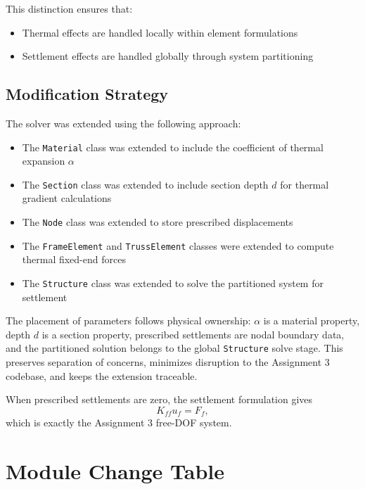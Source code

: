 This distinction ensures that:

\begin{itemize}
    \item Thermal effects are handled locally within element formulations
    \item Settlement effects are handled globally through system partitioning
\end{itemize}

\subsection{Modification Strategy}

The solver was extended using the following approach:

\begin{itemize}
    \item The \texttt{Material} class was extended to include the coefficient of thermal expansion $\alpha$
    \item The \texttt{Section} class was extended to include section depth $d$ for thermal gradient calculations
    \item The \texttt{Node} class was extended to store prescribed displacements
    \item The \texttt{FrameElement} and \texttt{TrussElement} classes were extended to compute thermal fixed-end forces
    \item The \texttt{Structure} class was extended to solve the partitioned system for settlement
\end{itemize}

The placement of parameters follows physical ownership: $\alpha$ is a material property, depth $d$ is a section property, prescribed settlements are nodal boundary data, and the partitioned solution belongs to the global \texttt{Structure} solve stage. This preserves separation of concerns, minimizes disruption to the Assignment 3 codebase, and keeps the extension traceable.

When prescribed settlements are zero, the settlement formulation gives
\begin{equation}
K_{ff}u_f = F_f,
\end{equation}
which is exactly the Assignment 3 free-DOF system.

\pagebreak
\section{Module Change Table}

